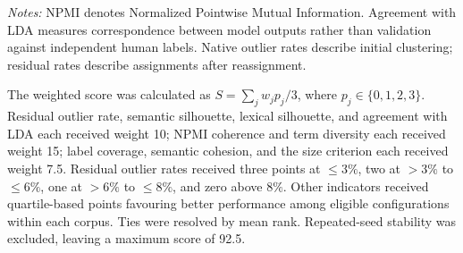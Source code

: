 \documentclass[a4paper,fleqn]{cas-sc}
\begin{document}
\begin{table}[htbp]
\begin{tabularx}{\textwidth}{p{30mm}p{25mm}X p{16mm}}
    \bottomrule
    \end{tabularx}
    \vspace{2mm}
    \begin{minipage}{\textwidth}
    \footnotesize
    \textit{Notes:} NPMI denotes Normalized Pointwise Mutual Information. Agreement with LDA measures correspondence between model outputs rather than validation against independent human labels. Native outlier rates describe initial clustering; residual rates describe assignments after reassignment.
    \end{minipage}
    \end{table}
    The weighted score was calculated as $S=\sum_j w_jp_j/3$, where $p_j\in\{0,1,2,3\}$. Residual outlier rate, semantic silhouette, lexical silhouette, and agreement with LDA each received weight 10; NPMI coherence and term diversity each received weight 15; label coverage, semantic cohesion, and the size criterion each received weight 7.5. Residual outlier rates received three points at $\leq3\%$, two at $>3\%$ to $\leq6\%$, one at $>6\%$ to $\leq8\%$, and zero above $8\%$. Other indicators received quartile-based points favouring better performance among eligible configurations within each corpus. Ties were resolved by mean rank. Repeated-seed stability was excluded, leaving a maximum score of 92.5.
    
\end{document}
